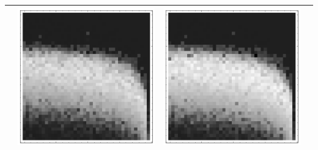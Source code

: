 \documentclass[10pt]{article}
\begin{document}
\begin{tabular}{|c|c|c|c|}
        & \includegraphics[scale=0.25]{plots/simple/LF-20BR10BR-20T10-CIFAR-2.png}
        & \includegraphics[scale=0.25]{plots/simple/LF-20BR10BR-20T10-CIFAR-3.png} \\ \hline
\end{tabular}
\end{document}
